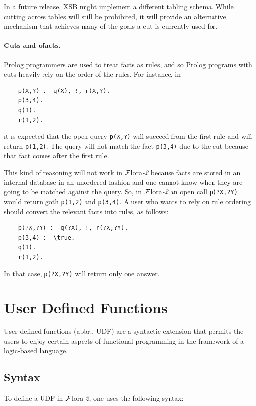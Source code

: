 \documentclass[11pt]{article}
\newcommand{\FLSYSTEM}{{\mbox{\sc ${\cal F}${lora}\rm\emph{-2}}}\xspace}
\begin{document}
In a future release, XSB might implement a different tabling schema. While
cutting across tables will still be prohibited, it will provide an
alternative mechanism that achieves many of the goals a cut is currently
used for.

\paragraph{Cuts and ofacts.}
Prolog programmers are used to treat facts as rules, and so Prolog programs
with cuts heavily rely on the order of the rules. For instance, in
\begin{verbatim}
    p(X,Y) :- q(X), !, r(X,Y).
    p(3,4).
    q(1).
    r(1,2).
\end{verbatim}
it is expected that the open query \texttt{p(X,Y)} will succeed from the
first rule and will return \texttt{p(1,2)}. The query will not match  
the fact \texttt{p(3,4)} due to the cut because that fact comes after the
first rule.

This kind of reasoning will not work in \FLSYSTEM because facts are stored in
an internal database in an unordered fashion and one cannot know when they
are going to be matched against the query. So, in \FLSYSTEM an open call
\texttt{p(?X,?Y)} would return goth \texttt{p(1,2)} and \texttt{p(3,4)}.
A user who wants to rely on rule ordering should convert the relevant
facts into rules, as follows:
\begin{verbatim}
    p(?X,?Y) :- q(?X), !, r(?X,?Y).
    p(3,4) :- \true.
    q(1).
    r(1,2).
\end{verbatim}
In that case, \texttt{p(?X,?Y)} will return only one answer.


\section{User Defined Functions} \label{sec:udf}


User-defined functions (abbr., UDF) are a syntactic extension that permits
the users to enjoy certain aspects of functional programming in the
framework of a logic-based language.
 

\subsection{Syntax}\label{sec-udf}
To define a UDF in
\FLSYSTEM, one uses the following syntax:
\end{document}
